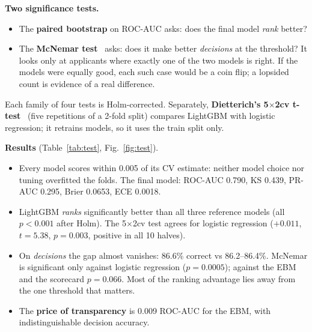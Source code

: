 \documentclass[conference,10pt]{IEEEtran}
\begin{document}
\textbf{Two significance tests.}
\begin{itemize}
\item The \textbf{paired bootstrap} on ROC-AUC asks: does the final model \emph{rank} better?
\item The \textbf{McNemar test}~\cite{mcnemar1947} asks: does it make better \emph{decisions}
at the threshold? It looks only at applicants where exactly one of the two models is right. If
the models were equally good, each such case would be a coin flip; a lopsided count is
evidence of a real difference.
\end{itemize}
Each family of four tests is Holm-corrected. Separately, \textbf{Dietterich's 5$\times$2cv
t-test}~\cite{dietterich1998} (five repetitions of a 2-fold split) compares LightGBM with
logistic regression; it retrains models, so it uses the train split only.

\textbf{Results} (Table~\ref{tab:test}, Fig.~\ref{fig:test}).
\begin{itemize}
\item Every model scores within 0.005 of its CV estimate: neither model choice nor tuning
overfitted the folds. The final model: ROC-AUC 0.790, KS 0.439, PR-AUC 0.295, Brier 0.0653,
ECE 0.0018.
\item LightGBM \emph{ranks} significantly better than all three reference models (all $p<0.001$
after Holm). The 5$\times$2cv test agrees for logistic regression ($+0.011$, $t=5.38$, $p=0.003$,
positive in all 10 halves).
\item On \emph{decisions} the gap almost vanishes: 86.6\% correct vs 86.2--86.4\%. McNemar is
significant only against logistic regression ($p=0.0005$); against the EBM and the scorecard
$p=0.066$. Most of the ranking advantage lies away from the one threshold that matters.
\item The \textbf{price of transparency} is 0.009 ROC-AUC for the EBM, with indistinguishable
decision accuracy.
\end{itemize}
\end{document}
